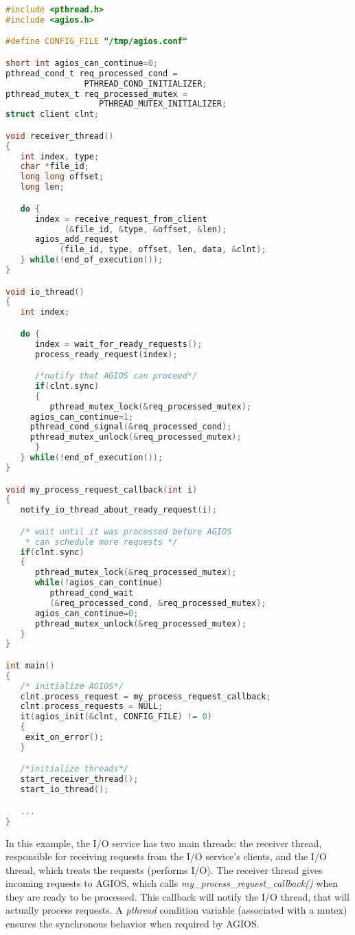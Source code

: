 \begin{lstlisting}[language=C, breaklines=true]
#include <pthread.h>
#include <agios.h>

#define CONFIG_FILE "/tmp/agios.conf"

short int agios_can_continue=0;
pthread_cond_t req_processed_cond = 
				PTHREAD_COND_INITIALIZER;
pthread_mutex_t req_processed_mutex = 
			       PTHREAD_MUTEX_INITIALIZER;
struct client clnt;

void receiver_thread()
{
   int index, type;
   char *file_id;
   long long offset;
   long len;

   do {
      index = receive_request_from_client
			(&file_id, &type, &offset, &len);
      agios_add_request
	       (file_id, type, offset, len, data, &clnt);
   } while(!end_of_execution());
}

void io_thread()
{
   int index;

   do {
      index = wait_for_ready_requests();
      process_ready_request(index);

      /*notify that AGIOS can proceed*/
      if(clnt.sync)
      {
         pthread_mutex_lock(&req_processed_mutex);
	 agios_can_continue=1;
	 pthread_cond_signal(&req_processed_cond);
	 pthread_mutex_unlock(&req_processed_mutex);			
      }
   } while(!end_of_execution());
}

void my_process_request_callback(int i)
{
   notify_io_thread_about_ready_request(i);

   /* wait until it was processed before AGIOS 
    * can schedule more requests */
   if(clnt.sync)
   {
      pthread_mutex_lock(&req_processed_mutex);
      while(!agios_can_continue)
         pthread_cond_wait
	     (&req_processed_cond, &req_processed_mutex);
      agios_can_continue=0;
      pthread_mutex_unlock(&req_processed_mutex);
   }
}

int main()
{
   /* initialize AGIOS*/
   clnt.process_request = my_process_request_callback;
   clnt.process_requests = NULL;
   it(agios_init(&clnt, CONFIG_FILE) != 0)
   {
	exit_on_error();
   }

   /*initialize threads*/
   start_receiver_thread();
   start_io_thread();

   ...
}

\end{lstlisting}

In this example, the I/O service has two main threads: the receiver thread, responsible for receiving requests from the I/O service's clients, and the I/O thread, which treats the requests (performs I/O). The receiver thread gives incoming requests to AGIOS, which calls \emph{my\_process\_request\_callback()} when they are ready to be processed. This callback will notify the I/O thread, that will actually process requests. A \emph{pthread} condition variable (associated with a mutex) ensures the synchronous behavior when required by AGIOS.

